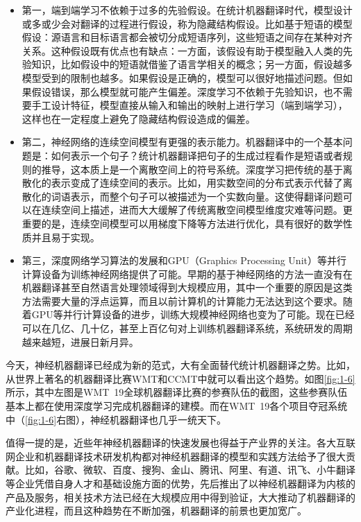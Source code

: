 \begin{itemize}
\vspace{0.5em}
\item 第一，端到端学习不依赖于过多的先验假设。在统计机器翻译时代，模型设计或多或少会对翻译的过程进行假设，称为隐藏结构假设。比如基于短语的模型假设：源语言和目标语言都会被切分成短语序列，这些短语之间存在某种对齐关系。这种假设既有优点也有缺点：一方面，该假设有助于模型融入人类的先验知识，比如假设中的短语就借鉴了语言学相关的概念；另一方面，假设越多模型受到的限制也越多。如果假设是正确的，模型可以很好地描述问题。但如果假设错误，那么模型就可能产生偏差。深度学习不依赖于先验知识，也不需要手工设计特征，模型直接从输入和输出的映射上进行学习（端到端学习），这样也在一定程度上避免了隐藏结构假设造成的偏差。
\vspace{0.5em}
\item 第二，神经网络的连续空间模型有更强的表示能力。机器翻译中的一个基本问题是：如何表示一个句子？统计机器翻译把句子的生成过程看作是短语或者规则的推导，这本质上是一个离散空间上的符号系统。深度学习把传统的基于离散化的表示变成了连续空间的表示。比如，用实数空间的分布式表示代替了离散化的词语表示，而整个句子可以被描述为一个实数向量。这使得翻译问题可以在连续空间上描述，进而大大缓解了传统离散空间模型维度灾难等问题。更重要的是，连续空间模型可以用梯度下降等方法进行优化，具有很好的数学性质并且易于实现。
\vspace{0.5em}
\item 第三，深度网络学习算法的发展和GPU（Graphics Processing Unit）等并行计算设备为训练神经网络提供了可能。早期的基于神经网络的方法一直没有在机器翻译甚至自然语言处理领域得到大规模应用，其中一个重要的原因是这类方法需要大量的浮点运算，而且以前计算机的计算能力无法达到这个要求。随着GPU等并行计算设备的进步，训练大规模神经网络也变为了可能。现在已经可以在几亿、几十亿，甚至上百亿句对上训练机器翻译系统，系统研发的周期越来越短，进展日新月异。
\vspace{0.5em}
\end{itemize}

\parinterval 今天，神经机器翻译已经成为新的范式，大有全面替代统计机器翻译之势。比如，从世界上著名的机器翻译比赛WMT和CCMT中就可以看出这个趋势。如图\ref{fig:1-6}所示，其中左图是WMT\ 19全球机器翻译比赛的参赛队伍的截图，这些参赛队伍基本上都在使用深度学习完成机器翻译的建模。而在WMT\ 19各个项目夺冠系统中（\ref{fig:1-6}右图），神经机器翻译也几乎一统天下。

\parinterval 值得一提的是，近些年神经机器翻译的快速发展也得益于产业界的关注。各大互联网企业和机器翻译技术研发机构都对神经机器翻译的模型和实践方法给予了很大贡献。比如，谷歌、微软、百度、搜狗、金山、腾讯、阿里、有道、讯飞、小牛翻译等企业凭借自身人才和基础设施方面的优势，先后推出了以神经机器翻译为内核的产品及服务，相关技术方法已经在大规模应用中得到验证，大大推动了机器翻译的产业化进程，而且这种趋势在不断加强，机器翻译的前景也更加宽广。

